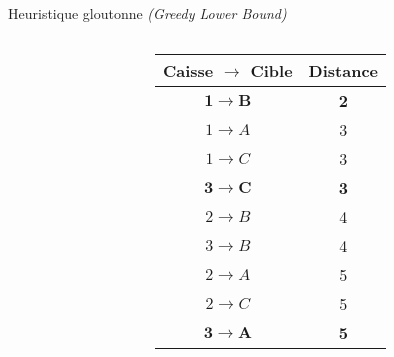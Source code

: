 \begin{frame}{Heuristique gloutonne \textit{(Greedy Lower Bound)}}
{\begin{columns}[onlytextwidth]
\begin{column}{0.5\textwidth}
{\begin{columns}[onlytextwidth]
                                \begin{column}{0.07\textwidth}
                                \end{column}
                            \end{columns}
                        }
                    \end{column}%
                    \begin{column}{0.4\textwidth}%
                        \begin{tabular}{ | c | c | }
                            \hline
                                Caisse $\rightarrow$ Cible & Distance \\
                            \hline
                            $\mathbf{1 \rightarrow B}$ & \textbf{2} \\
                            \hline
                            $1 \rightarrow A$ & 3 \\
                            \hline
                            $1 \rightarrow C$ & 3 \\
                            \hline
                            $\mathbf{3 \rightarrow C}$ & \textbf{3} \\
                            \hline
                            $2 \rightarrow B$ & 4 \\
                            \hline
                            $3 \rightarrow B$ & 4 \\
                            \hline
                            $2 \rightarrow A$ & 5 \\
                            \hline
                            $2 \rightarrow C$ & 5 \\
                            \hline
                            $\mathbf{3 \rightarrow A}$ & \textbf{5} \\
                            \hline
                        \end{tabular}
                    \end{column}
                \end{columns}
            }
        \end{frame}

